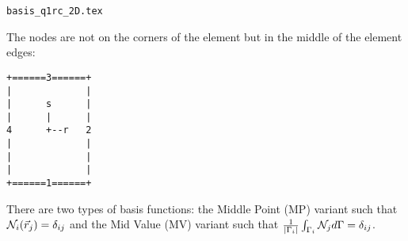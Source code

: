 \begin{flushright} {\tiny {\color{gray} \tt basis\_q1rc\_2D.tex}} \end{flushright}

The nodes are not on the corners of the element but in the middle of the
element edges:



\begin{verbatim}
+======3======+
|             |
|      s      |
|      |      |
4      +--r   2
|             |
|             |
|             |
+======1======+
\end{verbatim}

There are two types of basis functions: the Middle Point (MP) variant
such that ${\mathcal{N}}_i(\vec{r}_j)=\delta_{ij}$ and the Mid Value (MV) variant
such that $\frac{1}{|\Gamma_i|} \int_{\Gamma_i} {\mathcal{N}}_j d\Gamma = \delta_{ij}$.

